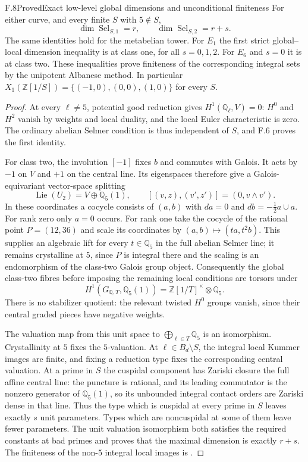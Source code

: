 \begin{statement}{F.8}{Proved}{Exact low-level global dimensions and unconditional finiteness}
For either curve, and every finite $S$ with $5\notin S$,
\[
 \dim\operatorname{Sel}_{S,1}=r,
 \qquad \dim\operatorname{Sel}_{S,2}=r+s.
\]
The same identities hold for the metabelian tower. For $E_1$ the first
strict global--local dimension inequality is at class one, for all
$s=0,1,2$. For $E_6$ and $s=0$ it is at class two. These inequalities
prove finiteness of the corresponding integral sets by the unipotent
Albanese method. In particular
$X_1(\mathbb Z[1/S])=\{(-1,0),(0,0),(1,0)\}$ for every $S$.
\end{statement}
\begin{proof}
At every $\ell\ne5$, potential good reduction gives
$H^1(\mathbb Q_\ell,V)=0$: $H^0$ and $H^2$ vanish by weights and local
duality, and the local Euler characteristic is zero. The ordinary
abelian Selmer condition is thus independent of $S$, and F.6 proves
the first identity.

For class two, the involution $[-1]$ fixes $b$ and commutes with Galois.
It acts by $-1$ on $V$ and $+1$ on the central line. Its eigenspaces
therefore give a Galois-equivariant vector-space splitting
\[
 \operatorname{Lie}(U_2)=V\oplus\mathbb Q_5(1),
 \qquad [(v,z),(v',z')]=(0,v\wedge v').
\]
In these coordinates a cocycle consists of $(a,b)$ with
$da=0$ and $db=-\tfrac12a\mathbin{\cup}a$.
For rank zero only $a=0$ occurs. For rank one take the cocycle of the
rational point $P=(12,36)$ and scale its coordinates by
$(a,b)\mapsto(ta,t^2b)$. This supplies an algebraic lift for every
$t\in\mathbb Q_5$ in the full abelian Selmer line; it remains
crystalline at $5$, since $P$ is integral there and the scaling is an
endomorphism of the class-two Galois group object. Consequently the
global class-two fibres before imposing the remaining local conditions
are torsors under
\[
 H^1(G_{\mathbb Q,T},\mathbb Q_5(1))
   =\mathbb Z[1/T]^\times\otimes\mathbb Q_5.
\]
There is no stabilizer quotient: the relevant twisted $H^0$ groups
vanish, since their central graded pieces have negative weights.

The valuation map from this unit space to
$\bigoplus_{\ell\in T}\mathbb Q_5$ is an isomorphism. Crystallinity
at $5$ fixes the $5$-valuation. At $\ell\in B_d\setminus S$, the
integral local Kummer images are finite, and fixing a reduction type
fixes the corresponding central valuation. At a prime in $S$ the
cuspidal component has Zariski closure the full affine central line:
the puncture is rational, and its leading commutator is the nonzero
generator of $\mathbb Q_5(1)$, so its unbounded integral contact orders
are Zariski dense in that line. Thus the type which is cuspidal at
every prime in $S$ leaves exactly $s$ unit parameters. Types which
are noncuspidal at some of them leave fewer parameters. The unit
valuation isomorphism both satisfies the required constants at bad
primes and proves that the maximal dimension is exactly $r+s$.
The finiteness of the non-$5$ integral local images is
\citet[Theorem 0.1 and Corollary 0.2]{FE_KimTamagawa2008}.


\end{proof}
